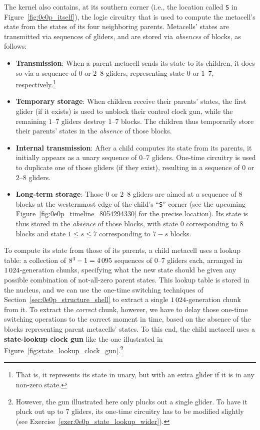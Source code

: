 The kernel also contains, at its southern corner (i.e., the location called \texttt{S} in Figure~\ref{fig:0e0p_itself}), the logic circuitry that is used to compute the metacell's state from the states of its four neighboring parents. Metacells' states are transmitted via sequences of gliders, and are stored via \emph{absences} of blocks, as follows:\smallskip

\begin{itemize}
	\item \textbf{Transmission}: When a parent metacell sends its state to its children, it does so via a sequence of $0$ or $2$--$8$ gliders, representing state $0$ or $1$--$7$, respectively.\footnote{That is, it represents its state in unary, but with an extra glider if it is in any non-zero state.}\smallskip
	
	\item \textbf{Temporary storage}: When children receive their parents' states, the first glider (if it exists) is used to unblock their control clock gun, while the remaining $1$--$7$ gliders destroy $1$--$7$ blocks. The children thus temporarily store their parents' states in the \emph{absence} of those blocks.\smallskip
	
	\item \textbf{Internal transmission}: After a child computes its state from its parents, it initially appears as a unary sequence of $0$--$7$ gliders. One-time circuitry is used to duplicate one of those gliders (if they exist), resulting in a sequence of $0$ or $2$--$8$ gliders.\smallskip
	
	\item \textbf{Long-term storage}: Those $0$ or $2$--$8$ gliders are aimed at a sequence of $8$ blocks at the westernmost edge of the child's ``\texttt{S}'' corner (see the upcoming Figure~\ref{fig:0e0p_timeline_8054294330} for the precise location). Its state is thus stored in the \emph{absence} of those blocks, with state $0$ corresponding to $8$ blocks and state $1 \leq s \leq 7$ corresponding to $7 - s$ blocks.\smallskip
\end{itemize}

To compute its state from those of its parents, a child metacell uses a lookup table: a collection of $8^4 - 1 = 4{\,}095$ sequences of $0$--$7$ gliders each, arranged in $1{\,}024$-generation chunks, specifying what the new state should be given any possible combination of not-all-zero parent states. This lookup table is stored in the nucleus, and we can use the one-time switching techniques of Section~\ref{sec:0e0p_structure_shell} to extract a single $1{\,}024$-generation chunk from it. To extract the \emph{correct} chunk, however, we have to delay those one-time switching operations to the correct moment in time, based on the absence of the blocks representing parent metacells' states. To this end, the child metacell uses a \textbf{state-lookup clock gun} like the one illustrated in Figure~\ref{fig:state_lookup_clock_gun}.\footnote{However, the gun illustrated here only plucks out a single glider. To have it pluck out up to $7$ gliders, its one-time circuitry has to be modified slightly (see Exercise~\ref{exer:0e0p_state_lookup_wider}).}

